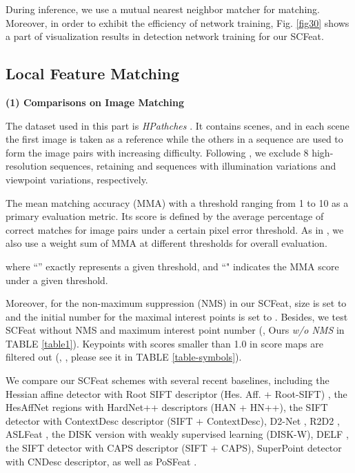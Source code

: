 \documentclass[journal]{IEEEtran}
\begin{document}
During inference, we use a mutual nearest neighbor matcher for matching. Moreover, in order to exhibit the efficiency of network training, Fig. \ref{fig30} shows a part of visualization results in detection network training for our SCFeat.


\subsection{Local Feature Matching}\label{sec-fm}






\textbf{(1) Comparisons on Image Matching}

The dataset used in this part is \emph{HPathches} \cite{HPatches}. It contains  scenes, and in each scene the first image is taken as a reference while the others in a sequence are used to form the image pairs with increasing difficulty. Following \cite{D2net,li2022decoupling}, we exclude 8 high-resolution sequences, retaining  and  sequences with illumination variations and viewpoint variations, respectively.

The mean matching accuracy (MMA) with a threshold ranging from 1 to 10 as a primary evaluation metric. Its score is defined by the average percentage of correct matches for image pairs under a certain pixel error threshold. As in \cite{li2022decoupling}, we also use a weight sum of MMA at different thresholds for overall evaluation.


where ``'' exactly represents a given threshold, and ``" indicates the MMA score under a given threshold.

Moreover, for the non-maximum suppression (NMS) in our SCFeat, size  is set to  and the initial number for the maximal interest points is set to . Besides, we test SCFeat without NMS and maximum interest point number  (, Ours \textit{w/o NMS} in TABLE \ref{table1}). Keypoints with scores smaller than 1.0 in score maps are filtered out (, , please see it in TABLE \ref{table-symbols}). 

We compare our SCFeat schemes with several recent baselines, including the Hessian affine detector with Root SIFT descriptor (Hes. Aff. + Root-SIFT) \cite{HesAffandSIFT}, the HesAffNet regions \cite{HesAffNet} with HardNet++ descriptors \cite{HardNetpp} (HAN + HN++), the SIFT detector with ContextDesc descriptor \cite{ContextDesc} (SIFT + ContextDesc), D2-Net \cite{D2net}, R2D2 \cite{R2D2}, ASLFeat \cite{aslfeat}, the DISK version \cite{disk} with weakly supervised learning  (DISK-W), DELF \cite{DELF}, the SIFT detector with CAPS descriptor \cite{caps} (SIFT + CAPS), SuperPoint \cite{SuperPoint} detector with CNDesc \cite{cndesc} descriptor, as well as PoSFeat \cite{li2022decoupling}.
\end{document}
